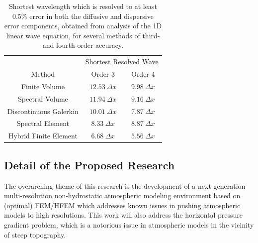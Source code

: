 \documentclass[11pt]{article}
\begin{document}
\begin{table}
\begin{center}
\begin{tabular}{ccc}
\hline & \multicolumn{2}{c}{\underline{Shortest Resolved Wave}} \\
Method & Order 3 & Order 4 \\
\hline \hline Finite Volume & $12.53\ \Delta x$ & $9.98\ \Delta x$ \\
Spectral Volume & $11.94\ \Delta x$ & $9.16\ \Delta x$ \\
Discontinuous Galerkin & $10.01\ \Delta x$ & $7.87\ \Delta x$ \\
Spectral Element & $8.33\ \Delta x$ & $8.87\ \Delta x$ \\
Hybrid Finite Element & $6.68\ \Delta x$ & $5.56\ \Delta x$ \\
\hline
\end{tabular}
\end{center}
\caption{Shortest wavelength which is resolved to at least 0.5\% error in both the diffusive and dispersive error components, obtained from analysis of the 1D linear wave equation, for several methods of third- and fourth-order accuracy.} \label{tab:ShortestResolvedWave}
\end{table}

\subsection{Detail of the Proposed Research} \label{sec:Research}

The overarching theme of this research is the development of a next-generation multi-resolution non-hydrostatic atmospheric modeling environment based on (optimal) FEM/HFEM which addresses known issues in pushing atmospheric models to high resolutions.  This work will also address the horizontal pressure gradient problem, which is a notorious issue in atmospheric models in the vicinity of steep topography.
\end{document}
